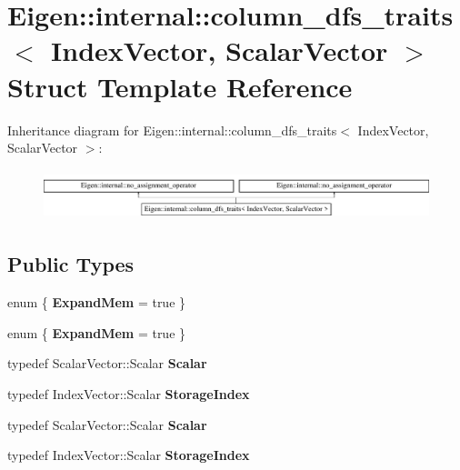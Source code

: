 \hypertarget{struct_eigen_1_1internal_1_1column__dfs__traits}{}\section{Eigen\+:\+:internal\+:\+:column\+\_\+dfs\+\_\+traits$<$ Index\+Vector, Scalar\+Vector $>$ Struct Template Reference}
\label{struct_eigen_1_1internal_1_1column__dfs__traits}
Inheritance diagram for Eigen\+:\+:internal\+:\+:column\+\_\+dfs\+\_\+traits$<$ Index\+Vector, Scalar\+Vector $>$\+:\begin{figure}[H]
\begin{center}
\leavevmode
\includegraphics[height=1.473684cm]{struct_eigen_1_1internal_1_1column__dfs__traits}
\end{center}
\end{figure}
\subsection*{Public Types}
\begin{DoxyCompactItemize}
\item 
\mbox{\label{struct_eigen_1_1internal_1_1column__dfs__traits_a340f11fde063267bc15e4f1c10b3881e}} 
enum \{ {\bfseries Expand\+Mem} = true
 \}
\item 
\mbox{\label{struct_eigen_1_1internal_1_1column__dfs__traits_aeb6231197aee1fb743d70432671d1e1c}} 
enum \{ {\bfseries Expand\+Mem} = true
 \}
\item 
\mbox{\label{struct_eigen_1_1internal_1_1column__dfs__traits_a8adc38f8b5e97c0ab3c8a90b1fd5cb9b}} 
typedef Scalar\+Vector\+::\+Scalar {\bfseries Scalar}
\item 
\mbox{\label{struct_eigen_1_1internal_1_1column__dfs__traits_a7c5616d5178c49c1374613aefa1d68ec}} 
typedef Index\+Vector\+::\+Scalar {\bfseries Storage\+Index}
\item 
\mbox{\label{struct_eigen_1_1internal_1_1column__dfs__traits_a8adc38f8b5e97c0ab3c8a90b1fd5cb9b}} 
typedef Scalar\+Vector\+::\+Scalar {\bfseries Scalar}
\item 
\mbox{\label{struct_eigen_1_1internal_1_1column__dfs__traits_a7c5616d5178c49c1374613aefa1d68ec}} 
typedef Index\+Vector\+::\+Scalar {\bfseries Storage\+Index}
\end{DoxyCompactItemize}
